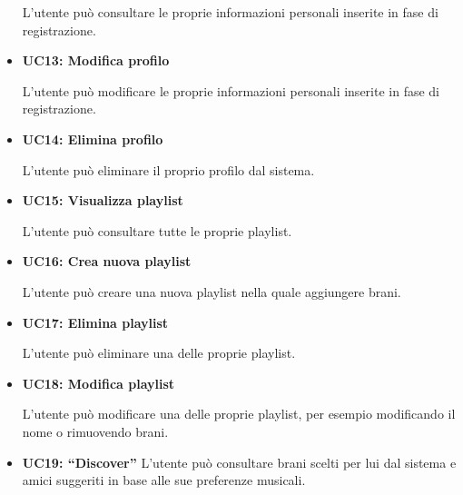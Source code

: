 \begin{itemize}
      L'utente può consultare le proprie informazioni personali inserite in fase di registrazione.
      \item \textbf{UC13: Modifica profilo} 
      
      L'utente può modificare le proprie informazioni personali inserite in fase di registrazione.
      \item \textbf{UC14: Elimina profilo} 
      
      L'utente può eliminare il proprio profilo dal sistema.
      \item \textbf{UC15: Visualizza playlist} 
      
      L'utente può consultare tutte le proprie playlist.
      \item \textbf{UC16: Crea nuova playlist} 
      
      L'utente può creare una nuova playlist nella quale aggiungere brani.
      \item \textbf{UC17: Elimina playlist}
      
      L'utente può eliminare una delle proprie playlist.
      \item \textbf{UC18: Modifica playlist} 
      
      L'utente può modificare una delle proprie playlist, per esempio modificando il nome o rimuovendo brani.
      \item \textbf{UC19: ``Discover''} 
      L'utente può consultare brani scelti per lui dal sistema e amici suggeriti in base alle sue preferenze musicali.

\end{itemize}

